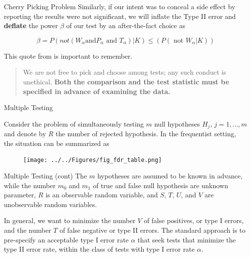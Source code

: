 \documentclass{beamer}
\begin{document}
\begin{frame}{Cherry Picking Problem}
Similarly, 
if our intent was to conceal a side effect by reporting the results were not significant, we will inflate the Type II error and {\bf deflate} the power $\beta$ of our test by an after-the-fact choice as 

\begin{equation*}
	\beta=P(not(W_\alpha \text{and} P_\alpha \text{ and } T_\alpha)|K)\le(P(\text{ not } W_\alpha |K))
\end{equation*}

This quote from \citep{commonerrstat} is important to remember.

\begin{quote}
	We are not free to pick and choose among tests; any such conduct is unethical.
	{\bf Both the comparison and the test statistic must be specified in advance of examining the data.}
\end{quote}
\end{frame}


\begin{frame}{Multiple Testing}
	
	Consider the problem of simultaneously testing $m$ null hypotheses $H_j$, $j=1,\ldots, m$ and denote by $R$ the
	number of rejected hypothesis. In the frequentist setting, the situation can be summarized as 
	
	\begin{figure}[h]
		\centering
		\texttt{[image: ../../Figures/fig\_fdr\_table.png]}
	\end{figure}
\end{frame}

\begin{frame}{Multiple Testing (cont)}	
	The $m$ hypotheses are assumed to be known in advance, while the number $m_0$ and $m_1$ of true and false null hypothesis are unknown parameter, $R$ is an observable random variable, and $S$, $T$, $U$, and $V$ are unobservable random variables. 
	
	In general, we want to minimize the number $V$ of false positives, or type I errors, and the number $T$ of false negative or type II errors. The standard approach is to pre-specify an acceptable type I error rate $\alpha$ that seek tests that minimize the type II error rate, within the class of tests with type I error rate $\alpha$. 
	

\end{frame}
\end{document}
